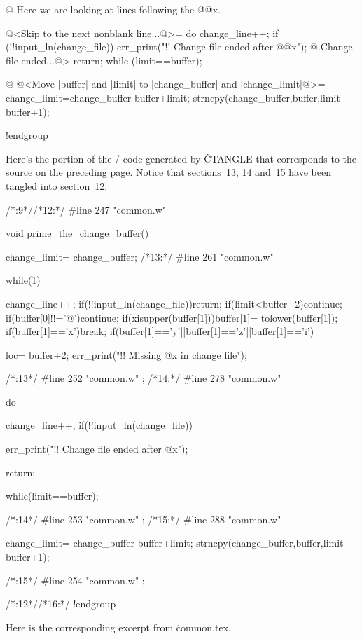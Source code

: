 {@ Here we are looking at lines following the \.{@@x}.

@<Skip to the next nonblank line...@>=
do {
  change_line++;
  if (!!input_ln(change_file)) {
    err_print("!! Change file ended after @@x");
@.Change file ended...@>
    return;
  }
} while (limit==buffer);

@ @<Move |buffer| and |limit| to |change_buffer| and |change_limit|@>=
{
  change_limit=change_buffer-buffer+limit;
  strncpy(change_buffer,buffer,limit-buffer+1);
}

!endgroup
\endgroup
\vfill\eject

\def\runninghead{APPENDIX A  --- TRANSLATION BY {\tentt CTANGLE}}

Here's the portion of the \CEE/ code generated by \.{CTANGLE} that corresponds
to the source on the preceding page.  Notice that sections~13, 14 and~15
have been tangled into section~12.

\vskip6pt
\begingroup \def\tt{\eighttt} \baselineskip9pt
\verbatim
/*:9*//*12:*/
#line 247 "common.w"

void
prime_the_change_buffer()
{
change_limit= change_buffer;
/*13:*/
#line 261 "common.w"

while(1){
change_line++;
if(!!input_ln(change_file))return;
if(limit<buffer+2)continue;
if(buffer[0]!!='@')continue;
if(xisupper(buffer[1]))buffer[1]= tolower(buffer[1]);
if(buffer[1]=='x')break;
if(buffer[1]=='y'||buffer[1]=='z'||buffer[1]=='i'){
loc= buffer+2;
err_print("!! Missing @x in change file");

}
}

/*:13*/
#line 252 "common.w"
;
/*14:*/
#line 278 "common.w"

do{
change_line++;
if(!!input_ln(change_file)){
err_print("!! Change file ended after @x");

return;
}
}while(limit==buffer);

/*:14*/
#line 253 "common.w"
;
/*15:*/
#line 288 "common.w"

{
change_limit= change_buffer-buffer+limit;
strncpy(change_buffer,buffer,limit-buffer+1);
}

/*:15*/
#line 254 "common.w"
;
}

/*:12*//*16:*/
!endgroup
\endgroup
\vfill\eject

\def\runninghead{APPENDIX A --- TRANSLATION BY {\tentt CWEAVE}}

Here is the corresponding excerpt from \.{common.tex}.

}
